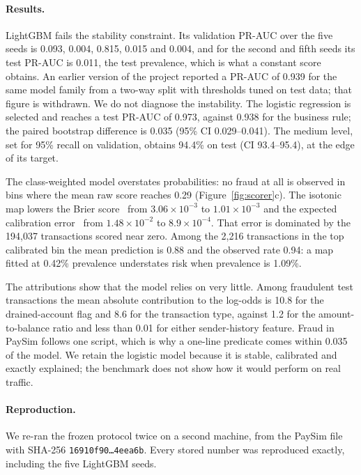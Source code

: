 \documentclass[10pt,a4paper]{article}
\newcommand{\code}[1]{\texttt{\small #1}}
\theoremstyle{tight}
\begin{document}
\paragraph{Results.} LightGBM fails the stability constraint. Its validation PR-AUC over the five seeds is 0.093,
0.004, 0.815, 0.015 and 0.004, and for the second and fifth seeds its test PR-AUC is 0.011, the test prevalence,
which is what a constant score obtains. An earlier version of the project reported a PR-AUC of 0.939 for the same model
family from a two-way split with thresholds tuned on test data; that figure is withdrawn. We do not diagnose the
instability. The logistic regression is selected and reaches a test PR-AUC of 0.973, against 0.938 for the
business rule; the paired bootstrap difference is 0.035 (95\% CI 0.029--0.041). The medium level, set for 95\%
recall on validation, obtains 94.4\% on test (CI 93.4--95.4), at the edge of its target.

The class-weighted model overstates probabilities: no fraud at all is observed in bins where the mean raw score
reaches 0.29 (Figure~\ref{fig:scorer}c). The isotonic map lowers the Brier score~\cite{brier1950} from
$3.06\times10^{-3}$ to $1.01\times10^{-3}$ and the expected calibration error~\cite{naeini2015} from
$1.48\times10^{-2}$ to $8.9\times10^{-4}$. That error is dominated by the 194,037 transactions scored near zero.
Among the 2,216 transactions in the top calibrated bin the mean prediction is 0.88 and the observed rate 0.94: a
map fitted at 0.42\% prevalence understates risk when prevalence is 1.09\%.

The attributions show that the model relies on very little. Among fraudulent test transactions the mean absolute
contribution to the log-odds is 10.8 for the drained-account flag and 8.6 for the transaction type, against 1.2
for the amount-to-balance ratio and less than 0.01 for either sender-history feature. Fraud in PaySim follows one
script, which is why a one-line predicate comes within 0.035 of the model. We retain the logistic model because it is
stable, calibrated and exactly explained; the benchmark does not show how it would perform on real traffic.

\paragraph{Reproduction.} We re-ran the frozen protocol twice on a second machine, from the PaySim file with SHA-256
\code{16910f90\ldots4eea6b}. Every stored number was reproduced exactly, including the five LightGBM seeds.
\end{document}
